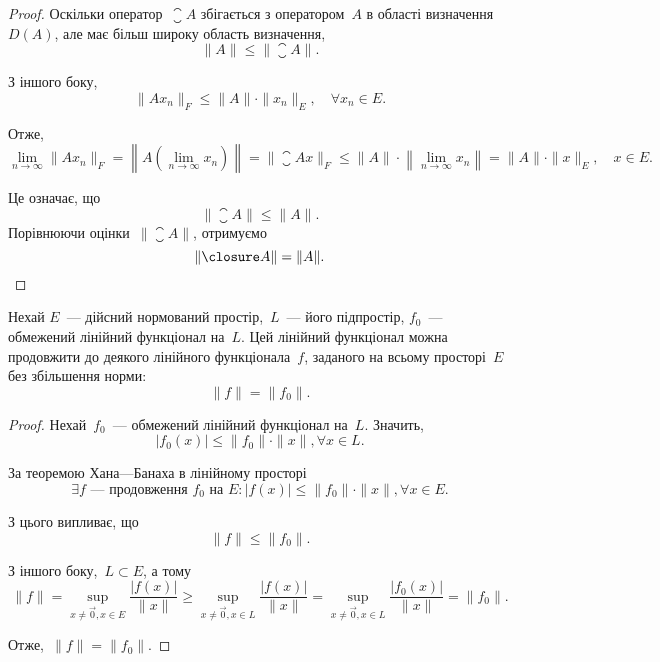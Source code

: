 \begin{proof}
Оскільки оператор~$\closure A$ збігається з оператором~$A$ в області
визначення~$D(A)$, але має більш широку область визначення,
\begin{equation*}
    \|A\| \le \|\closure A\|.
\end{equation*}

З іншого боку,
\begin{equation*}
    \|Ax_n\|_F \le \|A\| \cdot \|x_n\|_E, \quad \forall x_n \in E.
\end{equation*}

Отже,
\begin{equation*}
    \lim_{n \to \infty} \|Ax_n\|_F =
    \left\| A \left( \lim_{n \to \infty} x_n \right) \right\| =
    \| \closure A x \|_F \le 
    \|A\| \cdot \left\| \lim_{n \to \infty} x_n \right\| = 
    \|A\| \cdot \|x\|_E, \quad x \in E.
\end{equation*}

Це означає, що
\begin{equation*}
    \|\closure A\| \le \|A\|.
\end{equation*}
Порівнюючи оцінки~$\|\closure A\|$, отримуємо
\begin{equation*}
    \|\closure A\| = \|A\|. \qedhere
\end{equation*}
\end{proof}

\begin{theorem} Нехай
$E$~--- дійсний нормований простір,~$L$~--- його підпростір,
$f_0$~--- обмежений лінійний функціонал на~$L$. Цей лінійний
функціонал можна продовжити до деякого лінійного
функціонала~$f$, заданого на всьому просторі~$E$ без
збільшення норми:
\begin{equation*}
    \|f\| = \|f_0\|.
\end{equation*}
\end{theorem}

\begin{proof}
Нехай~$f_0$~--- обмежений лінійний функціонал на~$L$. Значить,
\begin{equation*}
    |f_0(x)| \le \|f_0\| \cdot \|x\|, \forall x \in L.
\end{equation*}

За теоремою Хана---Банаха в лінійному просторі
\begin{equation*}
    \exists f \text{~--- продовження } f_0 \text{ на } E:
    |f(x)| \le \|f_0\| \cdot \|x\|, \forall x \in E.
\end{equation*}

З цього випливає, що
\begin{equation*}
    \|f\| \le \|f_0\|.
\end{equation*}

З іншого боку,~$L \subset E$, а тому
\begin{equation*}
    \|f\| = \sup_{x \ne \vec 0, x \in E} \frac{|f(x)|}{\|x\|} \ge
    \sup_{x \ne \vec 0, x \in L} \frac{|f(x)|}{\|x\|} =
    \sup_{x \ne \vec 0, x \in L} \frac{|f_0(x)|}{\|x\|} = \|f_0\|.
\end{equation*}

Отже,~$\|f\| = \|f_0\|$.
\end{proof}

